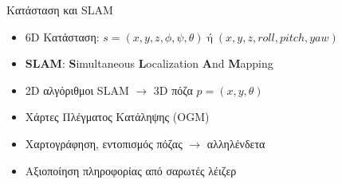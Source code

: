 \documentclass[10pt, compress, handout]{beamer} %
\begin{document}
\begin{frame}{Κατάσταση και SLAM}

	\begin{itemize}
		\item 6D Κατάσταση:  $s=(x,y,z,\phi,\psi,\theta)\; \text{ή}\; (x,y,z,roll,pitch,yaw)$
    	\item	\textbf{SLAM}: \textbf{S}imultaneous \textbf{L}ocalization \textbf{A}nd \textbf{M}apping
		\item 2D αλγόριθμοι SLAM $\rightarrow$ 3D πόζα $p=(x,y,\theta)$
		\item Χάρτες Πλέγματος Κατάληψης (OGM)
		\item Χαρτογράφηση, εντοπισμός πόζας $\rightarrow$ αλληλένδετα
		\item Αξιοποίηση πληροφορίας από σαρωτές λέιζερ
	\end{itemize}
	\vspace{-0.5cm}
	\begin{figure}[!ht]
		\hspace{0.1cm}
	\end{figure}		
\end{frame}
\end{document}
